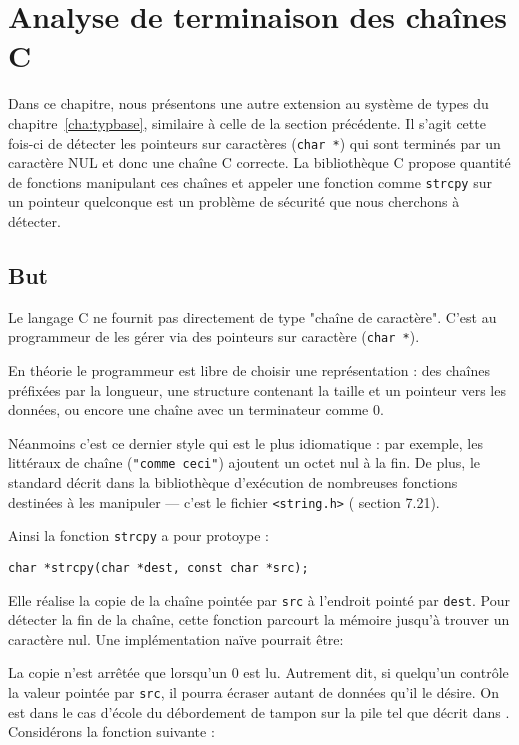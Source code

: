 \clearpage

\section{Analyse de terminaison des chaînes C}

Dans ce chapitre, nous présentons une autre extension au système de types du
chapitre~\ref{cha:typbase}, similaire à celle de la section précédente.
Il s'agit cette fois-ci de détecter les pointeurs sur caractères (\texttt{char
*}) qui sont terminés par un caractère NUL et donc une chaîne C correcte. La
bibliothèque C propose quantité de fonctions manipulant ces chaînes et appeler
une fonction comme \texttt{strcpy} sur un pointeur quelconque est un problème de
sécurité que nous cherchons à détecter.

\subsection{But}

Le langage C ne fournit pas directement de type "chaîne de caractère". C'est au
programmeur de les gérer via des pointeurs sur caractère (\texttt{char *}).

En théorie le programmeur est libre de choisir une représentation : des chaînes
préfixées par la longueur, une structure contenant la taille et un pointeur vers
les données, ou encore une chaîne avec un terminateur comme 0.

Néanmoins c'est ce dernier style qui est le plus idiomatique : par exemple, les
littéraux de chaîne (\texttt{"comme ceci"}) ajoutent un octet nul à la fin. De
plus, le standard décrit dans la bibliothèque d'exécution de nombreuses
fonctions destinées à les manipuler --- c'est le fichier
\texttt{\textless{}string.h\textgreater{}} (\cite{AnsiC} section 7.21).

Ainsi la fonction \texttt{strcpy} a pour protoype :

\begin{Verbatim}
char *strcpy(char *dest, const char *src);
\end{Verbatim}

Elle réalise la copie de la chaîne pointée par \texttt{src} à l'endroit pointé
par \texttt{dest}. Pour détecter la fin de la chaîne, cette fonction parcourt la
mémoire jusqu'à trouver un caractère nul. Une implémentation naïve pourrait être:


La copie n'est arrêtée que lorsqu'un 0 est lu. Autrement dit, si quelqu'un
contrôle la valeur pointée par \texttt{src}, il pourra écraser autant de données
qu'il le désire. On est dans le cas d'école du débordement de tampon sur la pile
tel que décrit dans \cite{SmashingTheStack}. Considérons la fonction suivante :

